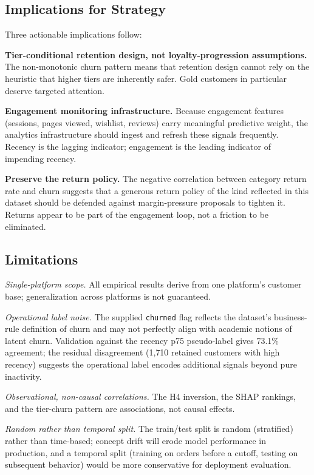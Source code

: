 \documentclass[conference]{IEEEtran}
\begin{document}
\subsection{Implications for Strategy}

Three actionable implications follow:

\textbf{Tier-conditional retention design, not loyalty-progression assumptions.} The non-monotonic churn pattern means that retention design cannot rely on the heuristic that higher tiers are inherently safer. Gold customers in particular deserve targeted attention.

\textbf{Engagement monitoring infrastructure.} Because engagement features (sessions, pages viewed, wishlist, reviews) carry meaningful predictive weight, the analytics infrastructure should ingest and refresh these signals frequently. Recency is the lagging indicator; engagement is the leading indicator of impending recency.

\textbf{Preserve the return policy.} The negative correlation between category return rate and churn suggests that a generous return policy of the kind reflected in this dataset should be defended against margin-pressure proposals to tighten it. Returns appear to be part of the engagement loop, not a friction to be eliminated.

\subsection{Limitations}

\emph{Single-platform scope.} All empirical results derive from one platform's customer base; generalization across platforms is not guaranteed.

\emph{Operational label noise.} The supplied \texttt{churned} flag reflects the dataset's business-rule definition of churn and may not perfectly align with academic notions of latent churn. Validation against the recency p75 pseudo-label gives 73.1\% agreement; the residual disagreement (1{,}710 retained customers with high recency) suggests the operational label encodes additional signals beyond pure inactivity.

\emph{Observational, non-causal correlations.} The H4 inversion, the SHAP rankings, and the tier-churn pattern are associations, not causal effects.

\emph{Random rather than temporal split.} The train/test split is random (stratified) rather than time-based; concept drift will erode model performance in production, and a temporal split (training on orders before a cutoff, testing on subsequent behavior) would be more conservative for deployment evaluation.
\end{document}
